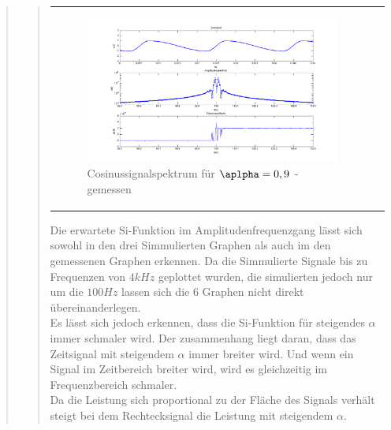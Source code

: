 \begin{quote}
\begin{quote}
\begin{center}
\begin{tabular}{ll}
\begin{minipage}{0.6\textwidth}
                    \begin{figure}[H]
                        \label{fig:}            
                        \includegraphics[scale=0.3]{./Bilder/cos_alpha9_-_gemessen.png} %
                        \caption{Cosinussignalspektrum für $\aplpha = 0,9$ - gemessen}
                    \end{figure}                
                 \vspace{-1.5em}

                \end{minipage}

            \end{tabular}
            \end{center}
        
            
            Die erwartete Si-Funktion im Amplitudenfrequenzgang lässt sich sowohl in den drei Simmulierten Graphen als
            auch im den gemessenen Graphen erkennen. Da die Simmulierte Signale bis zu Frequenzen von $4 kHz$ geplottet
            wurden, die simulierten jedoch nur um die $100 Hz$ lassen sich die 6 Graphen nicht direkt
            übereinanderlegen.\\
            Es lässt sich jedoch erkennen, dass die Si-Funktion für steigendes $\alpha$ immer schmaler wird. Der
            zusammenhang liegt daran, dass das Zeitsignal mit steigendem $\alpha$ immer breiter wird. Und wenn ein
            Signal im Zeitbereich breiter wird, wird es gleichzeitig im Frequenzbereich schmaler.\\
            
            Da die Leistung sich proportional zu der Fläche des Signals verhält steigt bei dem Rechtecksignal die
            Leistung mit steigendem $\alpha$.
                                          

\end{quote}
\end{quote}
